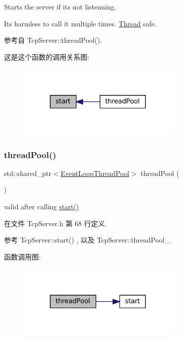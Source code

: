 Starts the server if it\textquotesingle{}s not listenning.

It\textquotesingle{}s harmless to call it multiple times. \hyperlink{classmuduo_1_1Thread}{Thread} safe. 

参考自 Tcp\+Server\+::thread\+Pool().

这是这个函数的调用关系图\+:
\nopagebreak
\begin{figure}[H]
\begin{center}
\leavevmode
\includegraphics[width=224pt]{classmuduo_1_1net_1_1TcpServer_a60de64d75454385b23995437f1d72669_icgraph}
\end{center}
\end{figure}
\mbox{\label{classmuduo_1_1net_1_1TcpServer_a403b616dd4691216b49bb8a13a6e8dd6}} 
\subsubsection{\texorpdfstring{thread\+Pool()}{threadPool()}}
{\footnotesize\ttfamily std\+::shared\+\_\+ptr$<$\hyperlink{classmuduo_1_1net_1_1EventLoopThreadPool}{Event\+Loop\+Thread\+Pool}$>$ thread\+Pool (\begin{DoxyParamCaption}{ }\end{DoxyParamCaption})\hspace{0.3cm}{\ttfamily [inline]}}



valid after calling \hyperlink{classmuduo_1_1net_1_1TcpServer_a60de64d75454385b23995437f1d72669}{start()} 



在文件 Tcp\+Server.\+h 第 68 行定义.



参考 Tcp\+Server\+::start() , 以及 Tcp\+Server\+::thread\+Pool\+\_\+.

函数调用图\+:
\nopagebreak
\begin{figure}[H]
\begin{center}
\leavevmode
\includegraphics[width=224pt]{classmuduo_1_1net_1_1TcpServer_a403b616dd4691216b49bb8a13a6e8dd6_cgraph}
\end{center}
\end{figure}


